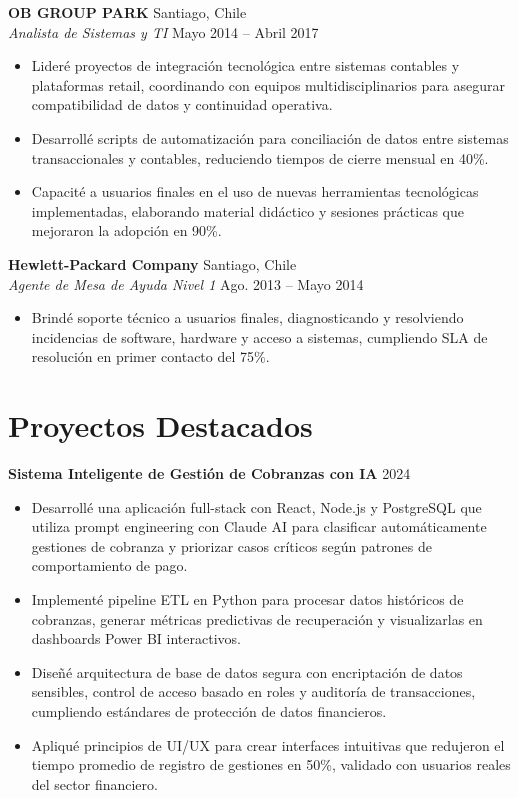 \documentclass[11pt,letterpaper]{article}
\begin{document}
\vspace{2pt}
\textbf{OB GROUP PARK} \hfill Santiago, Chile\\
\textit{Analista de Sistemas y TI} \hfill Mayo 2014 – Abril 2017
\begin{itemize}
  \item Lideré proyectos de integración tecnológica entre sistemas contables y plataformas retail, coordinando con equipos multidisciplinarios para asegurar compatibilidad de datos y continuidad operativa.
  \item Desarrollé scripts de automatización para conciliación de datos entre sistemas transaccionales y contables, reduciendo tiempos de cierre mensual en 40\%.
  \item Capacité a usuarios finales en el uso de nuevas herramientas tecnológicas implementadas, elaborando material didáctico y sesiones prácticas que mejoraron la adopción en 90\%.
\end{itemize}
\vspace{2pt}
\textbf{Hewlett-Packard Company} \hfill Santiago, Chile\\
\textit{Agente de Mesa de Ayuda Nivel 1} \hfill Ago. 2013 – Mayo 2014
\begin{itemize}
  \item Brindé soporte técnico a usuarios finales, diagnosticando y resolviendo incidencias de software, hardware y acceso a sistemas, cumpliendo SLA de resolución en primer contacto del 75\%.
\end{itemize}

\section{Proyectos Destacados}

\textbf{Sistema Inteligente de Gestión de Cobranzas con IA} \hfill 2024
\begin{itemize}
  \item Desarrollé una aplicación full-stack con React, Node.js y PostgreSQL que utiliza prompt engineering con Claude AI para clasificar automáticamente gestiones de cobranza y priorizar casos críticos según patrones de comportamiento de pago.
  \item Implementé pipeline ETL en Python para procesar datos históricos de cobranzas, generar métricas predictivas de recuperación y visualizarlas en dashboards Power BI interactivos.
  \item Diseñé arquitectura de base de datos segura con encriptación de datos sensibles, control de acceso basado en roles y auditoría de transacciones, cumpliendo estándares de protección de datos financieros.
  \item Apliqué principios de UI/UX para crear interfaces intuitivas que redujeron el tiempo promedio de registro de gestiones en 50\%, validado con usuarios reales del sector financiero.
\end{itemize}
\end{document}
